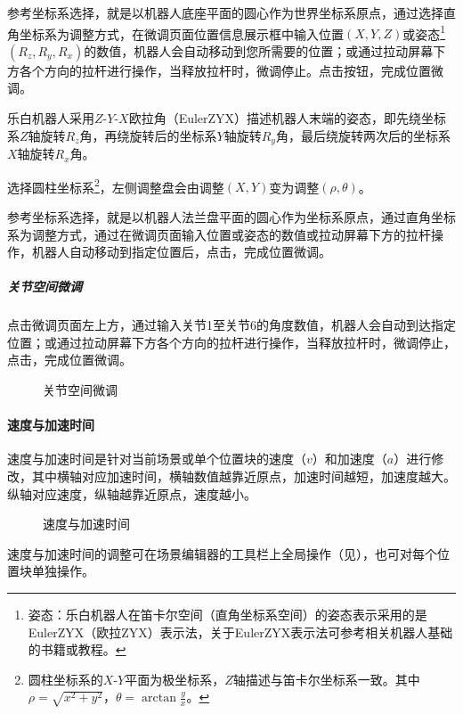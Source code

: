 参考坐标系选择，就是以机器人底座平面的圆心作为世界坐标系原点，通过选择直角坐标系为调整方式，在微调页面位置信息展示框中输入位置$(X, Y, Z)$或姿态\footnote{姿态：乐白机器人在笛卡尔空间（直角坐标系空间）的姿态表示采用的是EulerZYX（欧拉ZYX）表示法，关于EulerZYX表示法可参考相关机器人基础的书籍或教程。}$(R_z, R_y, R_x)$的数值，机器人会自动移动到您所需要的位置；或通过拉动屏幕下方各个方向的拉杆进行操作，当释放拉杆时，微调停止。点击按钮，完成位置微调。

乐白机器人采用$Z\textrm{-}Y\textrm{-}X$欧拉角（EulerZYX）描述机器人末端的姿态，即先绕坐标系$Z$轴旋转$R_z$角，再绕旋转后的坐标系$Y$轴旋转$R_y$角，最后绕旋转两次后的坐标系$X$轴旋转$R_x$角。

选择圆柱坐标系\footnote{圆柱坐标系的$X\textrm{-}Y$平面为极坐标系，$Z$轴描述与笛卡尔坐标系一致。其中 $\rho=\sqrt{x^2+y^2}$，$\theta=\arctan\frac{y}{x}$。}，左侧调整盘会由调整$(X, Y)$变为调整$(\rho, \theta)$。

参考坐标系选择，就是以机器人法兰盘平面的圆心作为坐标系原点，通过直角坐标系为调整方式，通过在微调页面输入位置或姿态的数值或拉动屏幕下方的拉杆操作，机器人自动移动到指定位置后，点击，完成位置微调。

\subparagraph{关节空间微调}
点击微调页面左上方，通过输入关节1至关节6的角度数值，机器人会自动到达指定位置；或通过拉动屏幕下方各个方向的拉杆进行操作，当释放拉杆时，微调停止，点击，完成位置微调。

\begin{figure}[ht]
	\centering
	\color{red}{缺图}
	\caption{关节空间微调}
	\label{fig:关节空间微调}
\end{figure}

\paragraph{速度与加速时间}
速度与加速时间是针对当前场景或单个位置块的速度（$v$）和加速度（$a$）进行修改，其中横轴对应加速时间，横轴数值越靠近原点，加速时间越短，加速度越大。纵轴对应速度，纵轴越靠近原点，速度越小。

\begin{figure}[ht]
	\centering
	\color{red}{缺图}
	\caption{速度与加速时间}
	\label{fig:速度与加速时间}
\end{figure}

速度与加速时间的调整可在场景编辑器的工具栏上全局操作（见），也可对每个位置块单独操作。

